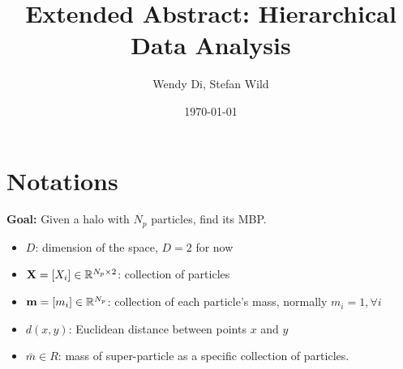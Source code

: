 \documentclass[10pt]{article}
\title{Extended Abstract: Hierarchical Data Analysis}
\author{Wendy Di, Stefan Wild}
\date{\today}
\begin{document}
  \maketitle 

 \section{Notations}
 {\bf Goal:} Given a halo with $N_p$ particles, find its MBP.
 \begin{itemize}
   \item $D$: dimension of the space, $D=2$ for now
   \item ${\bf X}=[X_i]\in \mathbb{R}^{N_p\times 2}$: collection of particles
   \item ${\bf m}=[m_i]\in \mathbb{R}^{N_p}$: collection of each particle's mass, normally $m_i=1, \forall i$
   \item $d(x,y)$: Euclidean distance between points $x$ and $y$
   \item $\bar m \in R$: mass of super-particle as a specific collection of particles.  
   \end{itemize}
\end{document}
